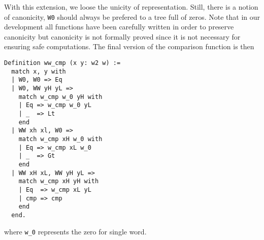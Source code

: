 With this extension, we loose the unicity of representation. Still, there is a notion
of canonicity, {\tt W0} should always be prefered to a tree full of zeros. Note that in
our development all functions have been carefully written in order to preserve canonicity but
canonicity  is not formally proved since it is not necessary for ensuring safe computations.
The final version of the comparison function is then
\begin{verbatim}
Definition ww_cmp (x y: w2 w) :=
  match x, y with
  | W0, W0 => Eq
  | W0, WW yH yL =>
    match w_cmp w_0 yH with
    | Eq => w_cmp w_0 yL
    | _  => Lt
    end
  | WW xh xl, W0 =>
    match w_cmp xH w_0 with
    | Eq => w_cmp xL w_0
    | _  => Gt
    end
  | WW xH xL, WW yH yL =>
    match w_cmp xH yH with
    | Eq  => w_cmp xL yL
    | cmp => cmp
    end
  end.
\end{verbatim}
where {\tt w\_0} represents the zero for single word.